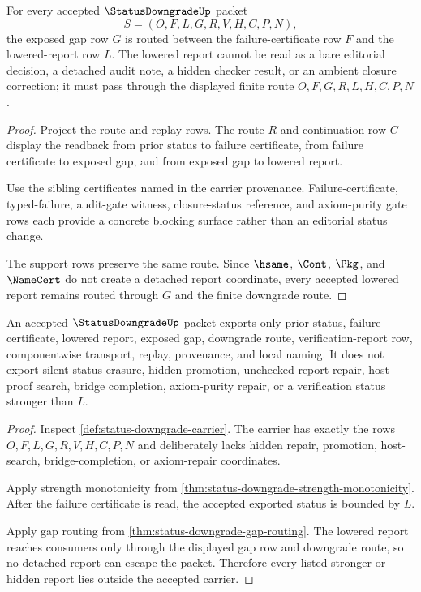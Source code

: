 \begin{theorem}
\label{thm:status-downgrade-gap-routing}
For every accepted $\StatusDowngradeUp$ packet
$$
S=(O,F,L,G,R,V,H,C,P,N),
$$
the exposed gap row $G$ is routed between the failure-certificate row $F$ and the lowered-report row $L$. The lowered report cannot be read as a bare editorial decision, a detached audit note, a hidden checker result, or an ambient closure correction; it must pass through the displayed finite route $O,F,G,R,L,H,C,P,N$.
\end{theorem}
\begin{proof}
Project the route and replay rows. The route $R$ and continuation row $C$ display the readback from prior status to failure certificate, from failure certificate to exposed gap, and from exposed gap to lowered report.

Use the sibling certificates named in the carrier provenance. Failure-certificate, typed-failure, audit-gate witness, closure-status reference, and axiom-purity gate rows each provide a concrete blocking surface rather than an editorial status change.

The support rows preserve the same route. Since $\hsame$, $\Cont$, $\Pkg$, and $\NameCert$ do not create a detached report coordinate, every accepted lowered report remains routed through $G$ and the finite downgrade route.
\end{proof}

\begin{theorem}
\label{thm:status-downgrade-nonescape}
An accepted $\StatusDowngradeUp$ packet exports only prior status, failure certificate, lowered report, exposed gap, downgrade route, verification-report row, componentwise transport, replay, provenance, and local naming. It does not export silent status erasure, hidden promotion, unchecked report repair, host proof search, bridge completion, axiom-purity repair, or a verification status stronger than $L$.
\end{theorem}
\begin{proof}
Inspect \autoref{def:status-downgrade-carrier}. The carrier has exactly the rows $O,F,L,G,R,V,H,C,P,N$ and deliberately lacks hidden repair, promotion, host-search, bridge-completion, or axiom-repair coordinates.

Apply strength monotonicity from \autoref{thm:status-downgrade-strength-monotonicity}. After the failure certificate is read, the accepted exported status is bounded by $L$.

Apply gap routing from \autoref{thm:status-downgrade-gap-routing}. The lowered report reaches consumers only through the displayed gap row and downgrade route, so no detached report can escape the packet. Therefore every listed stronger or hidden report lies outside the accepted carrier.
\end{proof}

